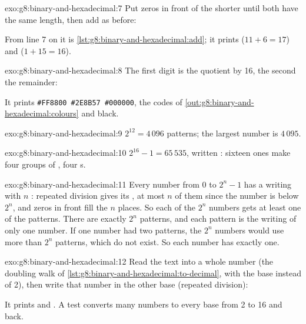 \begin{solution}{exo:g8:binary-and-hexadecimal:7}
Put zeros in front of the shorter  until both have the same length,
then add as before:

\label{lst:g8:binary-and-hexadecimal:sol-add-any}

From line 7 on it is \cref{lst:g8:binary-and-hexadecimal:add}; it prints 
($11 + 6 = 17$) and  ($1 + 15 = 16$).
\end{solution}

\begin{solution}{exo:g8:binary-and-hexadecimal:8}
The first digit is the quotient by 16, the second the remainder:

\label{lst:g8:binary-and-hexadecimal:sol-code}

It prints \texttt{\#FF8800 \#2E8B57 \#000000}, the codes of
\cref{out:g8:binary-and-hexadecimal:colours} and black.
\end{solution}

\begin{solution}{exo:g8:binary-and-hexadecimal:9}
$2^{12} = 4\,096$ patterns; the largest number is $4\,095$.
\end{solution}

\begin{solution}{exo:g8:binary-and-hexadecimal:10}
$2^{16} - 1 = 65\,535$, written : sixteen ones make four groups of
, four s.
\end{solution}

\begin{solution}{exo:g8:binary-and-hexadecimal:11}
Every number from 0 to $2^n - 1$ has a writing with $n$ : repeated
division gives its , at most $n$ of them since the number is below
$2^n$, and zeros in front fill the $n$ places. So each of the $2^n$ numbers
gets at least one of the patterns. There are exactly $2^n$ patterns, and each
pattern is the writing of only one number. If one number had two patterns,
the $2^n$ numbers would use more than $2^n$ patterns, which do not exist.
So each number has exactly one.
\end{solution}

\begin{solution}{exo:g8:binary-and-hexadecimal:12}
Read the text into a whole number (the doubling walk of
\cref{lst:g8:binary-and-hexadecimal:to-decimal}, with the base instead of 2),
then write that number in the other base (repeated division):

\label{lst:g8:binary-and-hexadecimal:sol-convert}

It prints  and . A test converts many
numbers to every base from 2 to 16 and back.
\end{solution}

